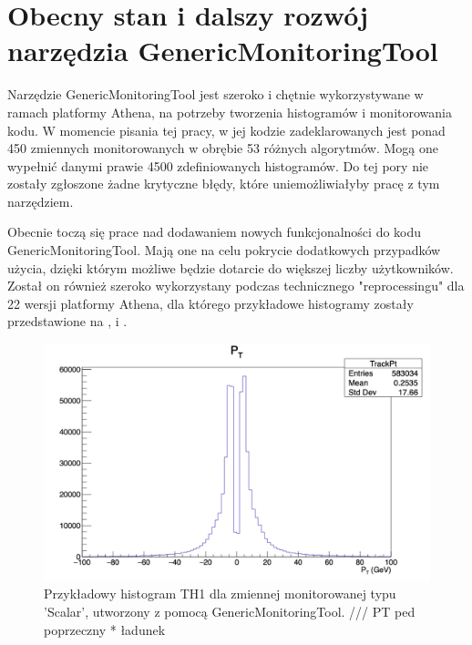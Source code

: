 \section{Obecny stan i dalszy rozwój narzędzia GenericMonitoringTool}
Narzędzie GenericMonitoringTool jest szeroko i chętnie wykorzystywane w ramach platformy Athena, na potrzeby tworzenia histogramów i monitorowania kodu.
W momencie pisania tej pracy, w jej kodzie zadeklarowanych jest ponad 450 zmiennych monitorowanych w obrębie 53 różnych algorytmów. 
Mogą one wypełnić danymi prawie 4500 zdefiniowanych histogramów.
Do tej pory nie zostały zgłoszone żadne krytyczne błędy, które uniemożliwiałyby pracę z tym narzędziem.

Obecnie toczą się prace nad dodawaniem nowych funkcjonalności do kodu GenericMonitoringTool.
Mają one na celu pokrycie dodatkowych przypadków użycia, dzięki którym możliwe będzie dotarcie do większej liczby użytkowników. 
Został on również szeroko wykorzystany podczas technicznego "reprocessingu" dla 22 wersji platformy Athena, dla którego przykładowe histogramy zostały przedstawione na ,  i .

\begin{figure}[!ht]
\centering
\includegraphics[width=1\textwidth]{img/histogram_TH1.png}
\caption{
Przykładowy histogram TH1 dla zmiennej monitorowanej typu 'Scalar', utworzony z pomocą GenericMonitoringTool. /// PT ped poprzeczny * ładunek
}
\label{fig:athena:histogram_TH1}
\end{figure}

